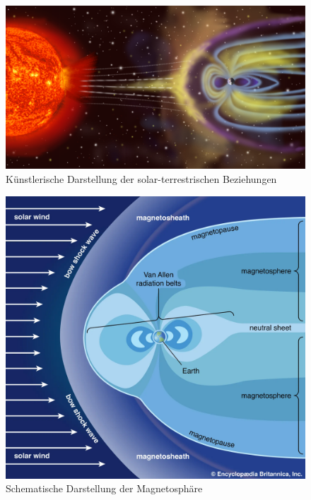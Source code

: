 \documentclass[
  a4paper,
  DIV=11]{scrreprt}
\begin{document}
\begin{figure}

{\centering \includegraphics{./images/paste-25F555DC.png}

}

\caption{Künstlerische Darstellung der solar-terrestrischen Beziehungen}

\end{figure}

\begin{figure}

{\centering \includegraphics{./images/paste-444DBB41.png}

}

\caption{Schematische Darstellung der Magnetosphäre}

\end{figure}
\end{document}
